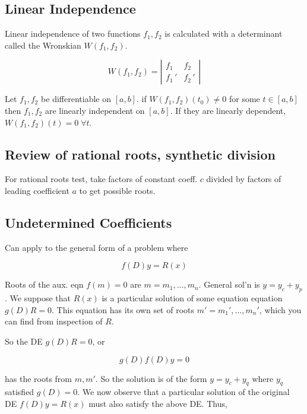 \subsection{Linear Independence}

Linear independence of two functions $f_1,f_2$ is calculated with a determinant called the Wronskian $W(f_1,f_2)$.

\begin{equation}
    W(f_1,f_2)=\left|\begin{matrix}f_1&f_2\\f_1\,'&f_2\,'\end{matrix}\right|
\end{equation}

Let $f_1,f_2$ be differentiable on $[a,b]$. if $W(f_1,f_2)(t_0)\neq 0$ for some $t\in [a,b]$ then $f_1,f_2$ are linearly independent on $[a,b]$.
If they are linearly dependent, $W(f_1,f_2)(t)=0\;\forall t$.

\subsection{Review of rational roots, synthetic division}

For rational roots test, take factors of constant coeff. $c$ divided by factors of
leading coefficient $a$ to get possible roots.

\subsection{Undetermined Coefficients}

Can apply to the general form of a problem where

\begin{equation}
    f(D)y=R(x)
\end{equation}

Roots of the aux. eqn $f(m)=0$ are $m=m_1,\ldots,m_n$.
General sol'n is $y=y_c+y_p$. We suppose that $R(x)$ is a particular solution of some equation equation $g(D)R=0$.
This equation has its own set of roots $m'=m_1',\ldots,m_n'$, which you can find from inspection of $R$.

So the DE $g(D)R=0$, or

\begin{equation}
    g(D)f(D)y=0
\end{equation}

has the roots from $m,m'$. So the solution is of the form $y=y_c+y_q$ where $y_q$ satisfied $g(D)=0$.
We now observe that a particular solution of the original DE $f(D)y=R(x)$ must also satisfy the above DE.
Thus,

